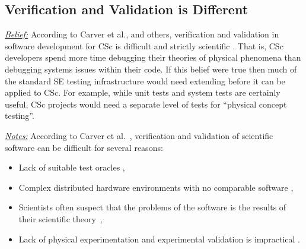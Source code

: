 \documentclass[conference,10pt]{IEEEtran}
\newcommand{\bi}{\begin{itemize}}
\newcommand{\ei}{\end{itemize}}
\newcommand{\fig}[1]{Figure~\ref{fig:#1}}
\newenvironment{RQ}{\vspace{1mm}\begin{tcolorbox}[enhanced,width=3.4in,size=fbox,colback=red!5!white,drop shadow southeast,sharp corners]}{\end{tcolorbox}}
\begin{document}
 


\subsection{Verification and Validation is Different}\label{vv}
\noindent \textit{\underline{Belief:}} 
According to Carver et al., and others, 
verification and validation in software development for CSc is difficult and strictly scientific \cite{carver07_environment, kanewala13_testing, carver06_hpc, Prabhu11_cssurvey, basili08_hpc}.
That is, CSc developers spend more time debugging their theories
of physical phenomena than debugging systems issues within their code.
If this belief were true then much of the standard SE testing
infrastructure would need extending before it can be applied to CSc. For example,
while unit tests and system tests are certainly useful, CSc projects would need a separate level of tests for ``physical concept testing''. 

\noindent \textit{\underline{Notes:}} 
According to Carver et al.~\cite{carver07_environment},
verification and validation of scientific software can be difficult for several reasons:
\bi
  \item Lack of suitable test oracles \cite{kanewala13_testing},
  \item Complex distributed hardware environments with no comparable software \cite{basili08_hpc},
  \item Scientists often suspect that the problems of the software is the results of their scientific theory~\cite{faulk09_secs},
  \item Lack of physical experimentation and experimental validation is impractical \cite{carver07_environment}. 
\ei
\end{document}
